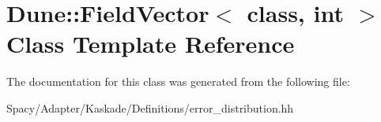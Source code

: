 \hypertarget{classDune_1_1FieldVector}{}\section{Dune\+:\+:Field\+Vector$<$ class, int $>$ Class Template Reference}
\label{classDune_1_1FieldVector}


The documentation for this class was generated from the following file\+:\begin{DoxyCompactItemize}
\item 
Spacy/\+Adapter/\+Kaskade/\+Definitions/error\+\_\+distribution.\+hh\end{DoxyCompactItemize}
